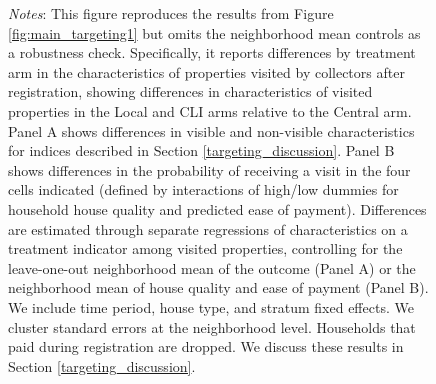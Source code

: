 \documentclass[12pt,english]{article}
\renewcommand{\footnotesize}{\fontsize{9pt}{11pt}\selectfont}\usepackage[unicode=true,
\begin{document}
\begin{figure}[H]
\parbox{6in}{\footnotesize \textit{Notes}: This figure reproduces the results from Figure \ref{fig:main_targeting1} but omits the neighborhood mean controls as a robustness check. Specifically, it reports differences by treatment arm in the characteristics of properties visited by collectors after registration, showing differences in characteristics of visited properties in the Local and CLI arms relative to the Central arm. Panel A shows differences in visible and non-visible characteristics for indices described in Section \ref{targeting_discussion}. Panel B shows differences in the probability of receiving a visit in the four cells indicated (defined by interactions of high/low dummies for household house quality and predicted ease of payment). Differences are estimated through separate regressions of characteristics on a treatment indicator among visited properties, controlling for the leave-one-out neighborhood mean of the outcome (Panel A) or the neighborhood mean of house quality and ease of payment (Panel B). We include time period, house type, and stratum fixed effects. We cluster standard errors at the neighborhood level. Households that paid during registration are dropped. We discuss these results in Section \ref{targeting_discussion}.}
\end{figure}



\end{document}
